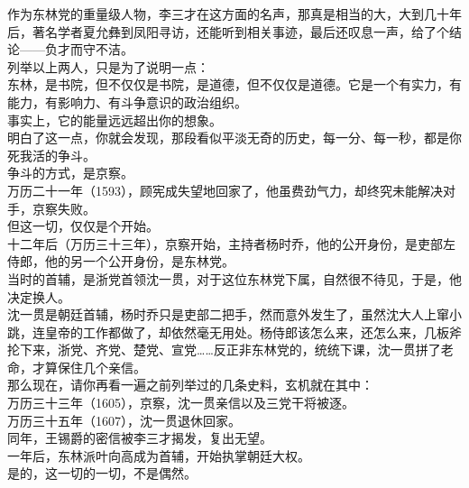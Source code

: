 \begin{multicols}{\theparacolNo}
作为东林党的重量级人物，李三才在这方面的名声，那真是相当的大，大到几十年后，著名学者夏允彝到凤阳寻访，还能听到相关事迹，最后还叹息一声，给了个结论——负才而守不洁。\\

列举以上两人，只是为了说明一点：\\

东林，是书院，但不仅仅是书院，是道德，但不仅仅是道德。它是一个有实力，有能力，有影响力、有斗争意识的政治组织。\\

事实上，它的能量远远超出你的想象。\\

明白了这一点，你就会发现，那段看似平淡无奇的历史，每一分、每一秒，都是你死我活的争斗。\\

争斗的方式，是京察。\\

万历二十一年（1593），顾宪成失望地回家了，他虽费劲气力，却终究未能解决对手，京察失败。\\

但这一切，仅仅是个开始。\\

十二年后（万历三十三年），京察开始，主持者杨时乔，他的公开身份，是吏部左侍郎，他的另一个公开身份，是东林党。\\

当时的首辅，是浙党首领沈一贯，对于这位东林党下属，自然很不待见，于是，他决定换人。\\

沈一贯是朝廷首辅，杨时乔只是吏部二把手，然而意外发生了，虽然沈大人上窜小跳，连皇帝的工作都做了，却依然毫无用处。杨侍郎该怎么来，还怎么来，几板斧抡下来，浙党、齐党、楚党、宣党……反正非东林党的，统统下课，沈一贯拼了老命，才算保住几个亲信。\\

那么现在，请你再看一遍之前列举过的几条史料，玄机就在其中：\\

万历三十三年（1605），京察，沈一贯亲信以及三党干将被逐。\\

万历三十五年（1607），沈一贯退休回家。\\

同年，王锡爵的密信被李三才揭发，复出无望。\\

一年后，东林派叶向高成为首辅，开始执掌朝廷大权。\\

是的，这一切的一切，不是偶然。\\


\end{multicols}
